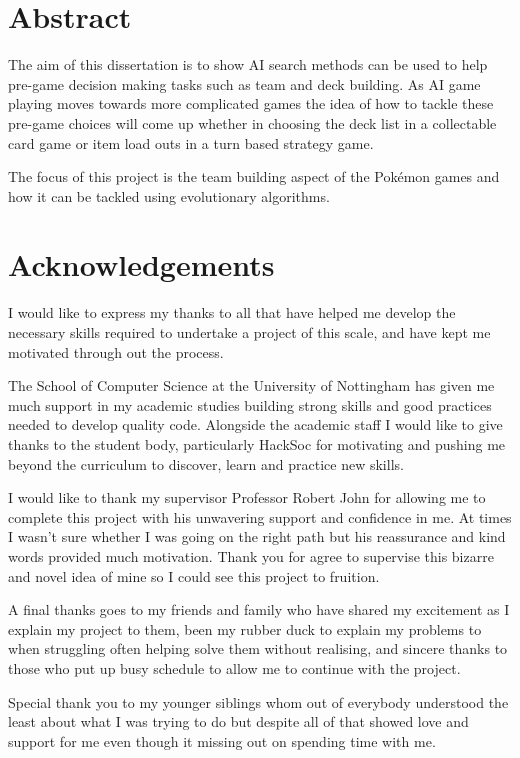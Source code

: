 \documentclass[a4paper]{article}
\newcommand{\Pokemon}{Pok\'{e}mon}
\begin{document}
\setcounter{page}{1}

\section*{Abstract}
\par
The aim of this dissertation is to show AI search methods can be used to help pre-game decision making tasks such as team and deck building.
As AI game playing moves towards more complicated games the idea of how to tackle these pre-game choices will come up whether in choosing the deck list in a collectable card game or item load outs in a turn based strategy game.
\par
The focus of this project is the team building aspect of the \Pokemon{} games and how it can be tackled using evolutionary algorithms.
\vfill
\section*{Acknowledgements}
\par
I would like to express my thanks to all that have helped me develop the necessary skills required to undertake a project of this scale, and have kept me motivated through out the process.
\\ \par
The School of Computer Science at the University of Nottingham has given me much support in my academic studies building strong skills and good practices needed to develop quality code. Alongside the academic staff I would like to give thanks to the student body, particularly HackSoc for motivating and pushing me beyond the curriculum to discover, learn and practice new skills.
\\ \par
I would like to thank my supervisor Professor Robert John for allowing me to complete this project with his unwavering support and confidence in me. At times I wasn't sure whether I was going on the right path but his reassurance and kind words provided much motivation. Thank you for agree to supervise this bizarre and novel idea of mine so I could see this project to fruition.
\\ \par
A final thanks goes to my friends and family who have shared my excitement as I explain my project to them, been my rubber duck to explain my problems to when struggling often helping solve them without realising, and sincere thanks to those who put up busy schedule to allow me to continue with the project.
\par
Special thank you to my younger siblings whom out of everybody understood the least about what I was trying to do but despite all of that showed love and support for me even though it missing out on spending time with me.
\end{document}
